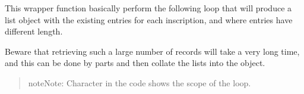 \documentclass[a4paper,12pt,english]{sphinxhowto}
\begin{document}
\ignorespaces 
\def\sphinxLiteralBlockLabel{\label{\detokenize{Epigraphic:index-0}}}
\begin{sphinxVerbatim}[commandchars=\\\{\},formatcom=\footnotesize]
     

 

 
\end{sphinxVerbatim}

This wrapper function basically perform the following loop that
will produce a list object with the existing entries for each inscription,
and where entries have different length.

\begin{sphinxVerbatim}[commandchars=\\\{\},formatcom=\footnotesize]
   
    
    \PYG{n}{[}\PYG{n+nf}{[length}\PYG{n}{]}\PYG{n}{]}  
    
\end{sphinxVerbatim}

Beware that retrieving such a large number of records will take a very long time,
and this can be done by parts and then collate the lists into the  object.
\begin{quote}

\begin{sphinxadmonition}{note}{Note:}
Character \sphinxcode{\sphinxupquote{+}} in the code shows the scope of the loop.
\end{sphinxadmonition}
\end{quote}
\end{document}
